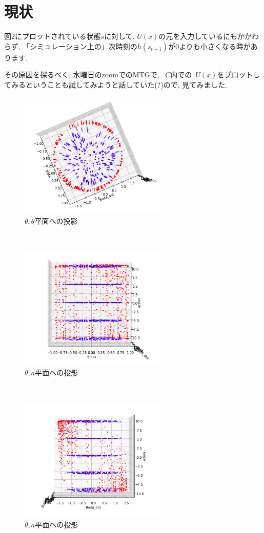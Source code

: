 \documentclass{jsarticle}
\begin{document}
\section{現状}
図2にプロットされている状態$s$に対して, $U(x)$の元を入力しているにもかかわらず, 「シミュレーション上の」次時刻の$h(s_{t+1})$が0よりも小さくなる時があります. \par
その原因を探るべく, 水曜日のzoomでのMTGで, ~$C$内での~$U(x)$をプロットしてみるということも試してみようと話していた(?)ので, 見てみました. \newpage
~
\begin{figure}[h]
	\centering
 	\includegraphics[width=7cm]{theta_thetadot.png}
 	\caption{$\theta, \dot{\theta}$平面への投影}
\end{figure}\\
\begin{figure}[h]
	\centering
 	\includegraphics[width=7cm]{theta_action.png}
 	\caption{$\theta, a$平面への投影}
\end{figure}\\
\begin{figure}[h]
	\centering
 	\includegraphics[width=7cm]{thetadot_action.png}
 	\caption{$\dot{\theta}, a$平面への投影}
\end{figure}\par
\end{document}
